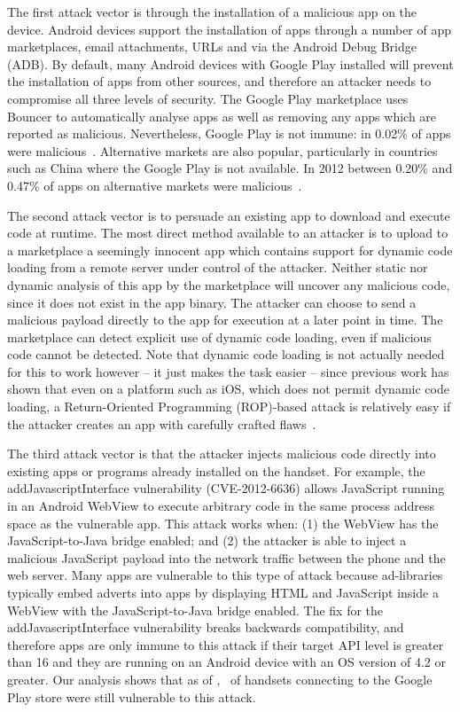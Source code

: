 \documentclass{llncs}
\let\OldTodo\todo
\renewcommand{\todo}{\OldTodo}%
\begin{document}
The first attack vector is through the installation of a malicious app on the device.
Android devices support the installation of apps through a number of app marketplaces, email attachments, URLs and via the Android Debug Bridge (ADB).
By default, many Android devices with Google Play installed will prevent the installation of apps from other sources, and therefore an attacker needs to compromise all three levels of security.
The Google Play marketplace uses Bouncer to automatically analyse apps as well as removing any apps which are reported as malicious.
Nevertheless, Google Play is not immune: in 0.02\% of apps were malicious~\cite{Zhou2012a}.
Alternative markets are also popular, particularly in countries such as China where the Google Play is not available. 
In 2012 between 0.20\% and 0.47\% of apps on alternative markets were malicious~\cite{Zhou2012a}.

The second attack vector is to persuade an existing app to download and execute code at runtime.
The most direct method available to an attacker is to upload to a marketplace a seemingly innocent app which contains support for dynamic code loading from a remote server under control of the attacker.
Neither static nor dynamic analysis of this app by the marketplace will uncover any malicious code, since it does not exist in the app binary.
The attacker can choose to send a malicious payload directly to the app for execution at a later point in time.
The marketplace can detect explicit use of dynamic code loading, even if malicious code cannot be detected. Note that dynamic code loading is not actually needed for this to work however -- it just makes the task easier -- since previous work has shown that even on a platform such as iOS, which does not permit dynamic code loading, a Return-Oriented Programming (ROP)-based attack is relatively easy if the attacker creates an app with carefully crafted flaws~\cite{Wang2013a}.

The third attack vector is that the attacker injects malicious code directly into existing apps or programs already installed on the handset. 
For example, the addJavascriptInterface vulnerability (CVE-2012-6636) allows JavaScript running in an Android WebView to execute arbitrary code in the same process address space as the vulnerable app.
This attack works when: (1) the WebView has the JavaScript-to-Java bridge enabled; and (2) the attacker is able to inject a malicious JavaScript payload into the network traffic between the phone and the web server. 
Many apps are vulnerable to this type of attack because ad-libraries typically embed adverts into apps by displaying HTML and JavaScript inside a WebView with the JavaScript-to-Java bridge enabled. 
The fix for the addJavascriptInterface vulnerability breaks backwards compatibility, and therefore apps are only immune to this attack if their target API level is greater than 16 and they are running on an Android device with an OS version of 4.2 or greater.
Our analysis shows that as of \daGPAPISeventeenLaterDate, \daGPAPISeventeenEarlierProportion\ of handsets connecting to the Google Play store were still vulnerable to this attack.
\end{document}
